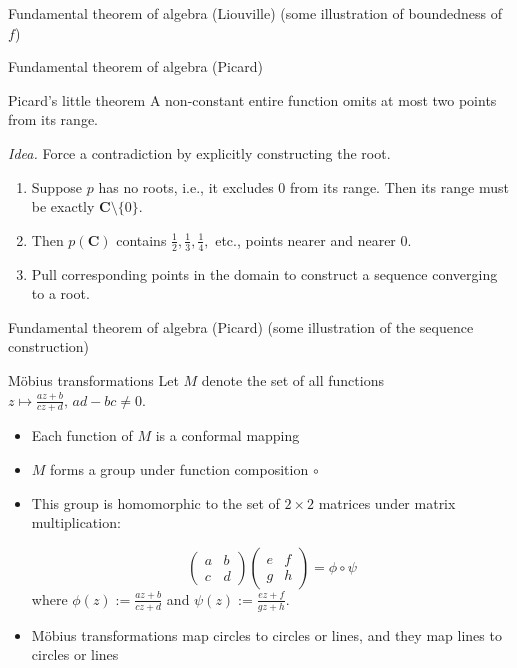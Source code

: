 \documentclass{beamer}
\begin{document}
\begin{frame}[t]{Fundamental theorem of algebra (Liouville)} \vspace{4pt}
(some illustration of boundedness of \(f\))
\end{frame}

\begin{frame}[t]{Fundamental theorem of algebra (Picard)} \vspace{4pt}
\begin{block}{Picard's little theorem}
A non-constant entire function omits at most two points from its range.
\end{block}
\textit{Idea.} Force a contradiction by explicitly constructing the root.
\begin{enumerate}
	\item Suppose \(p\) has no roots, i.e., it excludes \(0\) from its range. Then its range must be exactly \(\mathbf{C} \setminus \{0\}\).
	\item Then \(p(\mathbf{C})\) contains \(\frac{1}{2}, \frac{1}{3}, \frac{1}{4},\) etc., points nearer and nearer \(0\).
	\item Pull corresponding points in the domain to construct a sequence converging to a root.
\end{enumerate}
\end{frame}

\begin{frame}[t]{Fundamental theorem of algebra (Picard)} \vspace{4pt}
(some illustration of the sequence construction)
\end{frame}

\begin{frame}[t]{M\"{o}bius transformations} \vspace{4pt}
Let \(M\) denote the set of all functions \(z \mapsto \frac{az + b}{cz + d}, \, ad - bc \ne 0\).
\begin{itemize}
	\item Each function of \(M\) is a conformal mapping
	\item \(M\) forms a group under function composition \(\circ\)
	\item This group is homomorphic to the set of \(2 \times 2\) matrices under matrix multiplication:

	\[
		\begin{pmatrix}a & b \\ c & d\end{pmatrix} \begin{pmatrix}e & f \\ g & h\end{pmatrix} = \phi \circ \psi
	\]
	where \(\phi(z) := \frac{az + b}{cz + d}\) and \(\psi(z) := \frac{ez + f}{gz + h}\).
	\item M\"{o}bius transformations map circles to circles or lines, and they map lines to circles or lines
\end{itemize}
\end{frame}
\end{document}
